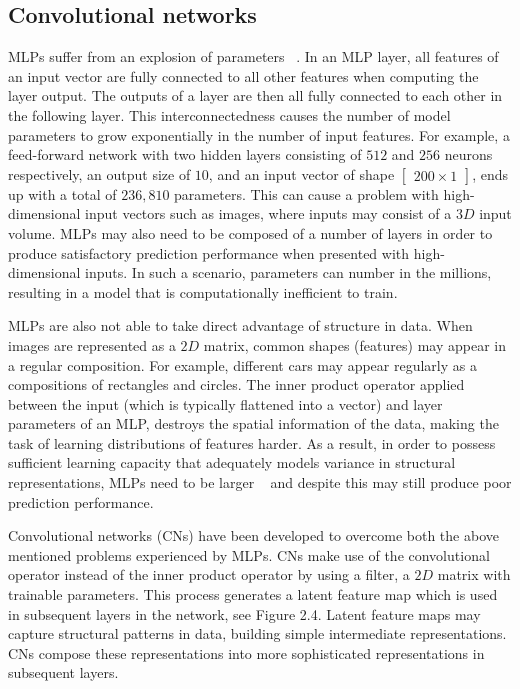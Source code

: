 
\subsection{Convolutional networks}

MLPs suffer from an explosion of parameters \unskip ~\citep{krizhevsky2012imagenet}. In an MLP layer, all features of an input vector are fully connected to all other features when computing the layer output. The outputs of a layer are then all fully connected to each other in the following layer. This interconnectedness causes the number of model parameters to grow exponentially in the number of input features. For example, a feed-forward network with two hidden layers consisting of $512$ and $256$ neurons respectively, an output size of $10$, and an input vector of shape $\left [ \begin{matrix} 200 \times 1 \end{matrix} \right] $, ends up with a total of $236,810$ parameters. This can cause a problem with high-dimensional input vectors such as images, where inputs may consist of a $ 3D $ input volume. MLPs may also need to be composed of a number of layers in order to produce satisfactory prediction performance when presented with high-dimensional inputs. In such a scenario, parameters can number in the millions, resulting in a model that is computationally inefficient to train. \par

\noindent MLPs are also not able to take direct advantage of structure in data. When images are represented as a $ 2D $ matrix, common shapes (features) may appear in a regular composition. For example, different cars may appear regularly as a compositions of rectangles and circles. The inner product operator applied between the input (which is typically flattened into a vector) and layer parameters of an MLP, destroys the spatial information of the data, making the task of learning distributions of features harder. As a result, in order to possess sufficient learning capacity that adequately models variance in structural representations, MLPs need to be larger \unskip ~\citep{lecun1998gradient} and despite this may still produce poor prediction performance. \par

\noindent Convolutional networks (CNs) have been developed to overcome both the above mentioned problems experienced by MLPs. CNs make use of the convolutional operator instead of the inner product operator by using a filter, a $ 2D $ matrix with trainable parameters. This process generates a latent feature map which is used in subsequent layers in the network, see Figure 2.4. Latent feature maps may capture structural patterns in data, building simple intermediate representations. CNs compose these representations into more sophisticated representations in subsequent layers. \par 

